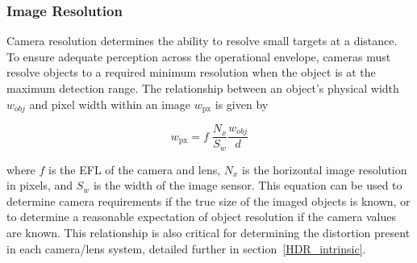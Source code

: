 \documentclass{erauthesis}
\begin{document}
\subsubsection{Image Resolution}
Camera resolution determines the ability to resolve small targets at a distance.
To ensure adequate perception across the operational envelope, cameras must resolve objects to a required minimum resolution when the object is at the maximum detection range.
The relationship between an object's physical width $\mathit{w}_{obj}$ and pixel width within an image $\mathit{w}_{\text{px}}$ is given by

\begin{equation}
\mathit{w}_{\text{px}} = f \; \frac{N_x}{S_w}\frac{\mathit{w}_{obj}}{d}
\end{equation}

where $f$ is the \ac{EFL} of the camera and lens, $N_x$ is the horizontal image resolution in pixels, and $S_w$ is the width of the image sensor.
This equation can be used to determine camera requirements if the true size of the imaged objects is known, or to determine a reasonable expectation of object resolution if the camera values are known.
This relationship is also critical for determining the distortion present in each camera/lens system, detailed further in section~\ref{HDR_intrinsic}.
\end{document}
